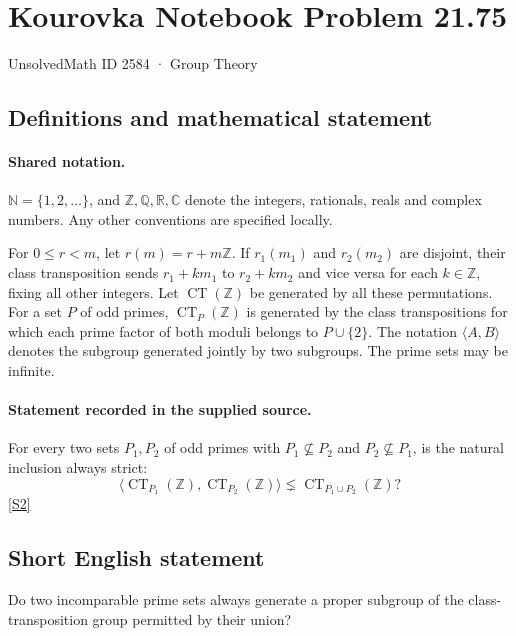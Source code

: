 \documentclass[11pt]{article}
\newcommand{\sref}[2]{\hyperlink{source:#1:#2}{[S#2]}}
\begin{document}
\setcounter{section}{2583}
\section{Kourovka Notebook Problem 21.75}\label{2584}
{\small\sffamily UnsolvedMath ID 2584 · Group Theory}
\subsection{Definitions and mathematical statement}

\paragraph{Shared notation.}$\mathbb N=\{1,2,\ldots\}$, and $\mathbb Z,\mathbb Q,\mathbb R,\mathbb C$ denote the integers, rationals, reals and complex numbers. Any other conventions are specified locally.


For $0\leq r<m$, let $r(m)=r+m\mathbb Z$. If $r_1(m_1)$ and $r_2(m_2)$ are disjoint, their class transposition sends $r_1+km_1$ to $r_2+km_2$ and vice versa for each $k\in\mathbb Z$, fixing all other integers. Let $\operatorname{CT}(\mathbb Z)$ be generated by all these permutations. For a set $P$ of odd primes, $\operatorname{CT}_P(\mathbb Z)$ is generated by the class transpositions for which each prime factor of both moduli belongs to $P\cup\{2\}$. The notation $\langle A,B\rangle$ denotes the subgroup generated jointly by two subgroups. The prime sets may be infinite.
\paragraph{Statement recorded in the supplied source.}
For every two sets $P_1,P_2$ of odd primes with $P_1\nsubseteq P_2$ and $P_2\nsubseteq P_1$, is the natural inclusion always strict:
\[
 \langle\operatorname{CT}_{P_1}(\mathbb Z),\operatorname{CT}_{P_2}(\mathbb Z)\rangle
 \lneq\operatorname{CT}_{P_1\cup P_2}(\mathbb Z)?
\] \sref{2584}{2}
\subsection{Short English statement}
Do two incomparable prime sets always generate a proper subgroup of the class-transposition group permitted by their union?
\end{document}
